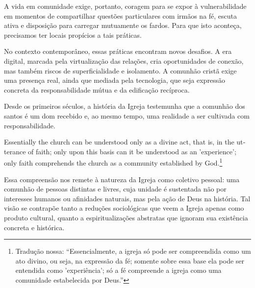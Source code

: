 A vida em comunidade exige, portanto, coragem para se expor à vulnerabilidade em momentos de compartilhar questões particulares com irmãos na fé, escuta ativa e disposição para carregar mutuamente os fardos. Para que isto aconteça, precisamos ter locais propícios a tais práticas.

No contexto contemporâneo, essas práticas encontram novos desafios. A era digital, marcada pela virtualização das relações, cria oportunidades de conexão, mas também riscos de superficialidade e isolamento. A comunhão cristã exige uma presença real, ainda que mediada pela tecnologia, que seja expressão concreta da responsabilidade mútua e da edificação recíproca.

Desde os primeiros séculos, a história da Igreja testemunha que a comunhão dos santos é um dom recebido e, ao mesmo tempo, uma realidade a ser cultivada com responsabilidade.

\begin{citacao}
    \foreignlanguage{english}{Essentially the church can be understood only as a divine act, that is, in the utterance of faith; only upon this basis can it be understood as an 'experience'; only faith comprehends the church as a community established by God.}\footnote{Tradução nossa: ``Essencialmente, a igreja só pode ser compreendida como um ato divino, ou seja, na expressão da fé; somente sobre essa base ela pode ser entendida como 'experiência'; só a fé compreende a igreja como uma comunidade estabelecida por Deus.''} \cite[p.~195]{bonhoeffer1963}
\end{citacao}

Essa compreensão nos remete à natureza da Igreja como coletivo pessoal: uma comunhão de pessoas distintas e livres, cuja unidade é sustentada não por interesses humanos ou afinidades naturais, mas pela ação de Deus na história. Tal visão se contrapõe tanto a reduções sociológicas que veem a Igreja apenas como produto cultural, quanto a espiritualizações abstratas que ignoram sua existência concreta e histórica.
